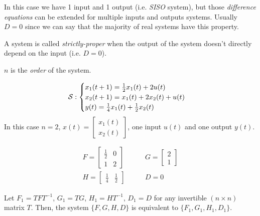 In this case we have 1 input and 1 output (i.e. \emph{SISO} system), but those \emph{difference equations} can be extended for multiple inputs and outputs systems. Usually $D=0$ since we can say that the majority of real systems have this property. 

\begin{definition} 
A system is called \emph{strictly-proper} when the output of the system doesn't directly depend on the input (i.e. $D=0$). 
\end{definition}

\begin{obs}
$n$ is the \emph{order} of the system.
\end{obs}

\begin{example}[SISO system of order $n=2$]
    \[
    \mathcal{S}: 
        \begin{cases}
            x_1(t+1) = \frac{1}{2} x_1(t) + 2u(t) \\
            x_2(t+1) = x_1(t) + 2x_2(t) + u(t) \\
            y(t) = \frac{1}{4}x_1(t) + \frac{1}{2}x_2(t)
        \end{cases}
    \]
    In this case $n=2$, $x(t) = \begin{bmatrix}
        x_1(t) \\
        x_2(t)
    \end{bmatrix}$, one input $u(t)$ and one output $y(t)$.

    \begin{align*}
        F = \begin{bmatrix}
            \frac{1}{2} & 0 \\
            1 & 2
        \end{bmatrix}
        & \qquad
        G = \begin{bmatrix}
            2 \\ 1
        \end{bmatrix}
        \\
        H = \begin{bmatrix}
            \frac{1}{4} & \frac{1}{2}
        \end{bmatrix}
        & \qquad
        D = 0
    \end{align*}
\end{example}


\begin{remark}
    Let $F_1 = TFT^{-1}$, $G_1 = TG$, $H_1 = HT^{-1}$, $D_1 = D$ for any invertible $(n\times n)$ matrix $T$. Then, the system $\{F, G, H, D\}$ is equivalent to $\{F_1, G_1, H_1, D_1\}$.
\end{remark}